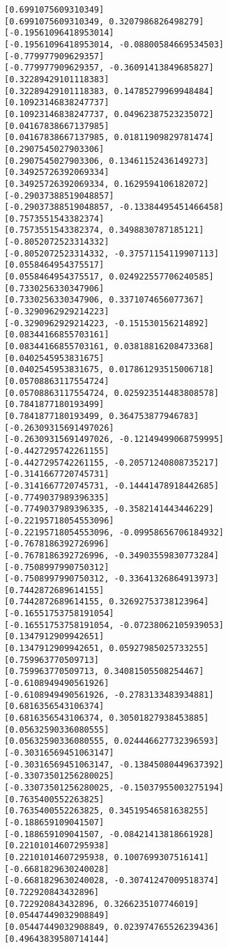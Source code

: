 \documentclass[11pt]{article}
\begin{document}
\begin{Verbatim}[commandchars=\\\{\}]
[0.6991075609310349]
[0.6991075609310349, 0.3207986826498279]
[-0.19561096418953014]
[-0.19561096418953014, -0.08800584669534503]
[-0.779977909629357]
[-0.779977909629357, -0.36091413849685827]
[0.32289429101118383]
[0.32289429101118383, 0.14785279969948484]
[0.10923146838247737]
[0.10923146838247737, 0.04962387523235072]
[0.04167838667137985]
[0.04167838667137985, 0.01811909829781474]
[0.2907545027903306]
[0.2907545027903306, 0.13461152436149273]
[0.34925726392069334]
[0.34925726392069334, 0.1629594106182072]
[-0.29037388519048857]
[-0.29037388519048857, -0.13384495451466458]
[0.7573551543382374]
[0.7573551543382374, 0.3498830787185121]
[-0.8052072523314332]
[-0.8052072523314332, -0.37571154119907113]
[0.0558464954375517]
[0.0558464954375517, 0.024922557706240585]
[0.7330256330347906]
[0.7330256330347906, 0.3371074656077367]
[-0.3290962929214223]
[-0.3290962929214223, -0.151530156214892]
[0.08344166855703161]
[0.08344166855703161, 0.03818816208473368]
[0.0402545953831675]
[0.0402545953831675, 0.017861293515006718]
[0.05708863117554724]
[0.05708863117554724, 0.025923514483808578]
[0.7841877180193499]
[0.7841877180193499, 0.364753877946783]
[-0.26309315691497026]
[-0.26309315691497026, -0.12149499068759995]
[-0.4427295742261155]
[-0.4427295742261155, -0.20571240808735217]
[-0.3141667720745731]
[-0.3141667720745731, -0.14441478918442685]
[-0.7749037989396335]
[-0.7749037989396335, -0.3582141443446229]
[-0.22195718054553096]
[-0.22195718054553096, -0.09958656706184932]
[-0.7678186392726996]
[-0.7678186392726996, -0.34903559830773284]
[-0.7508997990750312]
[-0.7508997990750312, -0.33641326864913973]
[0.7442872689614155]
[0.7442872689614155, 0.32692753738123964]
[-0.16551753758191054]
[-0.16551753758191054, -0.07238062105939053]
[0.1347912909942651]
[0.1347912909942651, 0.05927985025733255]
[0.759963770509713]
[0.759963770509713, 0.34081505508254467]
[-0.6108949490561926]
[-0.6108949490561926, -0.2783133483934881]
[0.6816356543106374]
[0.6816356543106374, 0.30501827938453885]
[0.05632590336080555]
[0.05632590336080555, 0.024446627732396593]
[-0.30316569451063147]
[-0.30316569451063147, -0.13845080449637392]
[-0.33073501256280025]
[-0.33073501256280025, -0.15037955003275194]
[0.7635400552263825]
[0.7635400552263825, 0.34519546581638255]
[-0.188659109041507]
[-0.188659109041507, -0.08421413818661928]
[0.22101014607295938]
[0.22101014607295938, 0.1007699307516141]
[-0.6681829630240028]
[-0.6681829630240028, -0.30741247009518374]
[0.722920843432896]
[0.722920843432896, 0.3266235107746019]
[0.05447449032908849]
[0.05447449032908849, 0.023974765526239436]
[0.49643839580714144]

\end{Verbatim}
\end{document}
